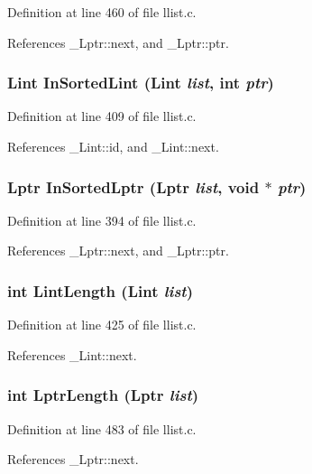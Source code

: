 Definition at line 460 of file llist.c.

References \_\-Lptr::next, and \_\-Lptr::ptr.
\subsubsection{\setlength{\rightskip}{0pt plus 5cm}\bf{Lint} In\-Sorted\-Lint (\bf{Lint} {\em list}, int {\em ptr})}\label{llist_8h_377921897693f066382d9ecb9f3cc70f}




Definition at line 409 of file llist.c.

References \_\-Lint::id, and \_\-Lint::next.
\subsubsection{\setlength{\rightskip}{0pt plus 5cm}\bf{Lptr} In\-Sorted\-Lptr (\bf{Lptr} {\em list}, void $\ast$ {\em ptr})}\label{llist_8h_574b53ca987edaf772b0eaab4b01d152}




Definition at line 394 of file llist.c.

References \_\-Lptr::next, and \_\-Lptr::ptr.
\subsubsection{\setlength{\rightskip}{0pt plus 5cm}int Lint\-Length (\bf{Lint} {\em list})}\label{llist_8h_a356168e5d726ab331b1399f46ff0ef2}




Definition at line 425 of file llist.c.

References \_\-Lint::next.
\subsubsection{\setlength{\rightskip}{0pt plus 5cm}int Lptr\-Length (\bf{Lptr} {\em list})}\label{llist_8h_b1d415009ec1742e8c506008ec65e66d}




Definition at line 483 of file llist.c.

References \_\-Lptr::next.

